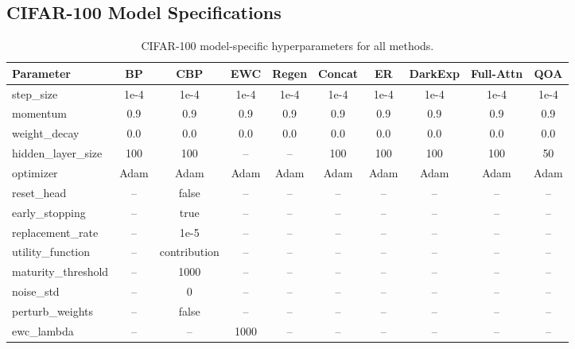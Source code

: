 \documentclass{article}
\begin{document}
\subsection{CIFAR-100 Model Specifications}
\label{sec:cifar_model_specs}

\begin{table}[!ht]

\setlength{\abovecaptionskip}{2pt}
\setlength{\belowcaptionskip}{2pt}

\caption{CIFAR-100 model-specific hyperparameters for all methods.}
\label{tab:cifar_model_specs}

\centering
\scriptsize
\setlength{\tabcolsep}{2pt}

\begin{tabular}{lccccccccc}
\toprule
\textbf{Parameter} & \textbf{BP} & \textbf{CBP} & \textbf{EWC} & \textbf{Regen} & \textbf{Concat} & \textbf{ER} & \textbf{DarkExp} & \textbf{Full-Attn} & \textbf{QOA} \\
\midrule
step\_size          & 1e-4 & 1e-4 & 1e-4 & 1e-4 & 1e-4 & 1e-4 & 1e-4 & 1e-4 & 1e-4 \\
momentum            & 0.9  & 0.9  & 0.9  & 0.9  & 0.9  & 0.9  & 0.9  & 0.9  & 0.9  \\
weight\_decay       & 0.0  & 0.0  & 0.0  & 0.0  & 0.0  & 0.0  & 0.0  & 0.0  & 0.0  \\
hidden\_layer\_size & 100  & 100  & --   & --   & 100  & 100  & 100  & 100  & 50   \\
optimizer           & Adam & Adam & Adam & Adam & Adam & Adam & Adam & Adam & Adam \\
\midrule
reset\_head         & --   & false & --  & --   & --   & --   & --   & --   & --   \\
early\_stopping     & --   & true  & --  & --   & --   & --   & --   & --   & --   \\
replacement\_rate   & --   & 1e-5  & --  & --   & --   & --   & --   & --   & --   \\
utility\_function   & --   & contribution & -- & -- & -- & -- & -- & -- & -- \\
maturity\_threshold & --   & 1000  & --  & --   & --   & --   & --   & --   & --   \\
noise\_std          & --   & 0     & --  & --   & --   & --   & --   & --   & --   \\
perturb\_weights    & --   & false & --  & --   & --   & --   & --   & --   & --   \\
\midrule
ewc\_lambda         & --   & --    & 1000 & --  & --   & --   & --   & --   & --   \\

\end{tabular}
\end{table}
\end{document}
